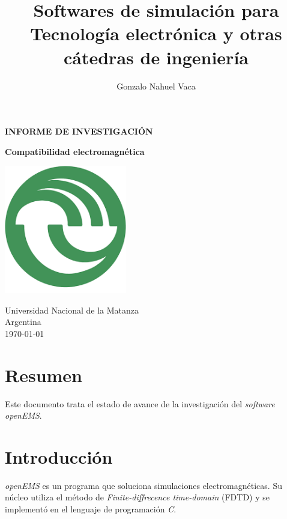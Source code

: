 \documentclass[
    11pt,
    spanish,
    a4paper
]{article}
\title{Softwares de simulación para Tecnología electrónica y otras cátedras de ingeniería}
\author{Gonzalo Nahuel Vaca}
\def\doctype{INFORME DE INVESTIGACIÓN}
\begin{document}
\makeatletter
\begin{titlepage}
	\begin{center}
		\vspace*{1cm}

		\Huge
		\textbf{\doctype}
		\vspace{0.5cm}

		\LARGE
		\@title
		\vspace{0.5cm}

		\textbf{Compatibilidad electromagnética}

		\vspace{1.5cm}

		\textbf{\@author}

		\vspace{1.5cm}

		\includegraphics[width=0.4\textwidth]{img/logoUNLaM.png}

		\vfill
		Universidad Nacional de la Matanza\\
		Argentina\\
		\today
	\end{center}
\end{titlepage}
\makeatother
\newpage

\section*{Resumen}

Este documento trata el estado de avance de la investigación del \emph{software} \emph{openEMS}.

\section*{Introducción}

\emph{openEMS} es un programa que soluciona simulaciones electromagnéticas.
Su núcleo utiliza el método de \emph{Finite-diffrecence time-domain} (FDTD) y se implementó en el lenguaje de programación \emph{C}.
\end{document}
